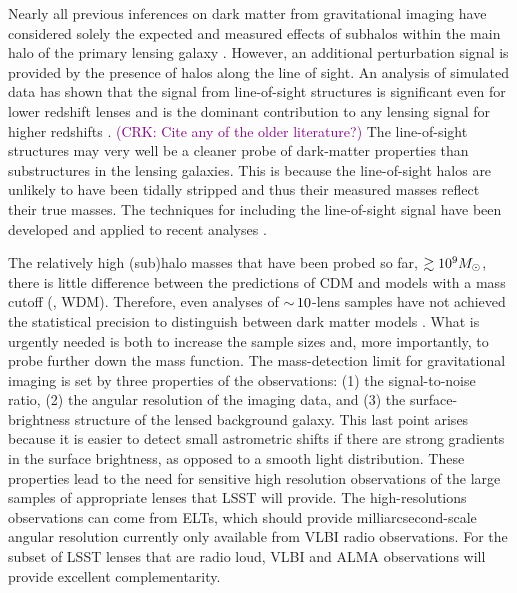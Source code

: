 \documentclass[modern,linenumbers]{aastex62}
\newcommand{\Comment}[3]{\textcolor{#1}{(#2: #3)}}
\newcommand{\CRK}[1]{\Comment{purple}{CRK}{#1}} %
\begin{document}
Nearly all previous inferences on dark matter from gravitational imaging have considered solely the expected and measured effects of subhalos within the main halo of the primary lensing galaxy \citep[e.g.,][]{Vegetti:2009aa, Vegetti_2012, Vegetti2014, Hezaveh_2016ltk}.
However, an additional perturbation signal is provided by the presence of halos along the line of sight.
An analysis of simulated data has shown that the signal from line-of-sight structures is significant even for lower redshift lenses and is the dominant contribution to any lensing signal for higher redshifts \citep{Despali++18}.
\CRK{Cite any of the older literature?}
The line-of-sight structures may very well be a cleaner probe of dark-matter properties than substructures in the lensing galaxies.
This is because the line-of-sight halos are unlikely to have been tidally stripped and thus their measured masses reflect their true masses.
The techniques for including the line-of-sight signal have been developed and applied to recent analyses \citep{Ritondale++18}. 
 
The relatively high (sub)halo masses that have been probed so far, $\gtrsim 10^9M_\odot$, there is little difference between the predictions of CDM and models with a mass cutoff (\eg, WDM).
Therefore, even analyses of $ {\sim}\,10$-lens samples have not achieved the statistical precision to distinguish between dark matter models \citep{Vegetti2014, Ritondale++18}.
What is urgently needed is both to increase the sample sizes and, more importantly, to probe further down the mass function.
The mass-detection limit for gravitational imaging is set by three properties of the observations: (1) the signal-to-noise ratio, (2) the angular resolution of the imaging data, and (3) the surface-brightness structure of the lensed background galaxy.  This last point arises because it is easier to detect small astrometric shifts if there are strong gradients in the surface brightness, as opposed to a smooth light distribution.
These properties lead to the need for sensitive high resolution observations of the large samples of appropriate lenses that LSST will provide.
The high-resolutions observations can come from ELTs, which should provide milliarcsecond-scale angular resolution currently only available from VLBI radio observations.
For the subset of LSST lenses that are radio loud, VLBI and ALMA observations will provide excellent complementarity.

\vspace{1em} 
\end{document}
